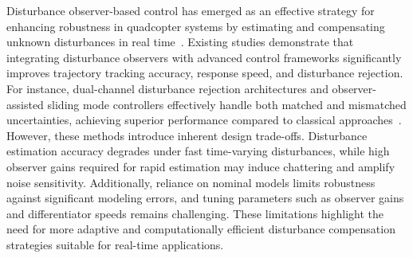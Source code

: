 \noindent Disturbance observer-based control has emerged as an effective strategy for enhancing robustness in quadcopter systems by estimating and compensating unknown disturbances in real time~\cite{pan2021robust,sang2024quadrotor,ahmed2022adaptive}. Existing studies demonstrate that integrating disturbance observers with advanced control frameworks significantly improves trajectory tracking accuracy, response speed, and disturbance rejection. For instance, dual-channel disturbance rejection architectures and observer-assisted sliding mode controllers effectively handle both matched and mismatched uncertainties, achieving superior performance compared to classical approaches~\cite{pan2021robust,sang2024quadrotor}. However, these methods introduce inherent design trade-offs. Disturbance estimation accuracy degrades under fast time-varying disturbances, while high observer gains required for rapid estimation may induce chattering and amplify noise sensitivity. Additionally, reliance on nominal models limits robustness against significant modeling errors, and tuning parameters such as observer gains and differentiator speeds remains challenging. These limitations highlight the need for more adaptive and computationally efficient disturbance compensation strategies suitable for real-time applications.



